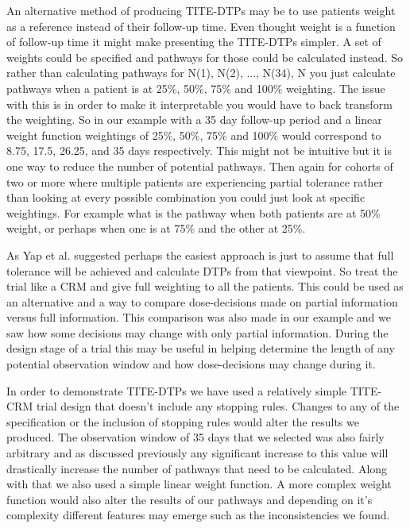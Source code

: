 An alternative method of producing TITE-DTPs may be to use patients weight as a reference instead of their follow-up time. Even thought weight is a function of follow-up time it might make presenting the TITE-DTPs simpler. A set of weights could be specified and pathways for those could be calculated instead. So rather than calculating pathways for N(1), N(2), ..., N(34), N you just calculate pathways when a patient is at 25\%, 50\%, 75\% and 100\% weighting. The issue with this is in order to make it interpretable you would have to back transform the weighting. So in our example with a 35 day follow-up period and a linear weight function weightings of 25\%, 50\%, 75\% and 100\% would correspond to 8.75, 17.5, 26.25, and 35 days respectively. This might not be intuitive but it is one way to reduce the number of potential pathways. Then again for cohorts of two or more where multiple patients are experiencing partial tolerance rather than looking at every possible combination you could just look at specific weightings. For example what is the pathway when both patients are at 50\% weight, or perhaps when one is at 75\% and the other at 25\%.  

As Yap et al. \cite{yapDoseTransitionPathways2017} suggested perhaps the easiest approach is just to assume that full tolerance will be achieved and calculate DTPs from that viewpoint. So treat the trial like a CRM and give full weighting to all the patients. This could be used as an alternative and a way to compare dose-decisions made on partial information versus full information. This comparison was also made in our example and we saw how some decisions may change with only partial information. During the design stage of a trial this may be useful in helping determine the length of any potential observation window and how dose-decisions may change during it.  

In order to demonstrate TITE-DTPs we have used a relatively simple TITE-CRM trial design that doesn't include any stopping rules. Changes to any of the specification or the inclusion of stopping rules would alter the results we produced. The observation window of 35 days that we selected was also fairly arbitrary and as discussed previously any significant increase to this value will drastically increase the number of pathways that need to be calculated. Along with that we also used a simple linear weight function. A more complex weight function would also alter the results of our pathways and depending on it's complexity different features may emerge such as the inconsistencies we found. 

